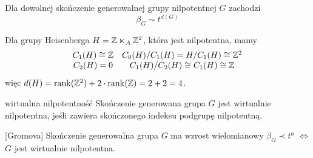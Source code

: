 \begin{fact}{}{}
  Dla dowolnej skończenie generowalnej grupy nilpotentnej $G$ zachodzi 
  $$\beta_G \sim t^{d(G)}$$
\end{fact}

\begin{example}
  Dla grupy Heisenberga $H=\mathbb{Z}\ltimes_A\mathbb{Z}^2$, która jest nilpotentna, mamy 
  $$\begin{matrix}
    C_1(H)\cong\mathbb{Z} & C_0(H)/C_1(H)=H/C_1(H)\cong\mathbb{Z}^2 \\
    C_2(H)=0  & C_1(H)/C_2(H)\cong C_1(H)\cong\mathbb{Z} 
  \end{matrix}$$
  więc $d(H)=\operatorname{rank}(\mathbb{Z}^2)+2\cdot\operatorname{rank}(\mathbb{Z})=2+2=4$.
\end{example}

\begin{definition}{wirtualna nilpotentność}{}
  Skończenie generowana grupa $G$ jest wirtualnie nilpotentna, jeśli zawiera skończonego indeksu podgrupę nilpotentną.
\end{definition}

\begin{theorem}{[Gromova]}{}
  Skończenie generowalna grupa $G$ ma wzrost wielomianowy $\beta_G\prec t^a$ $\iff$ $G$ jest wirtualnie nilpotentna.
\end{theorem}




